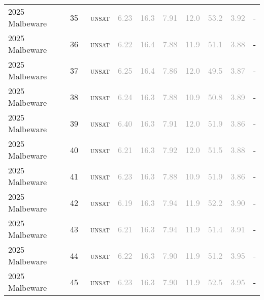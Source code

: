 \begin{center}
{\begin{longtable}{@{}llllllllll@{}}
2025 Malbeware & 35 & ~\textsc{unsat} & \textcolor{darkgray}{6.23} & \textcolor{darkgray}{16.3} & \textcolor{darkgray}{7.91} & \textcolor{darkgray}{12.0} & \textcolor{darkgray}{53.2} & \textcolor{darkgray}{3.92} & - \\
2025 Malbeware & 36 & ~\textsc{unsat} & \textcolor{darkgray}{6.22} & \textcolor{darkgray}{16.4} & \textcolor{darkgray}{7.88} & \textcolor{darkgray}{11.9} & \textcolor{darkgray}{51.1} & \textcolor{darkgray}{3.88} & - \\
2025 Malbeware & 37 & ~\textsc{unsat} & \textcolor{darkgray}{6.25} & \textcolor{darkgray}{16.4} & \textcolor{darkgray}{7.86} & \textcolor{darkgray}{12.0} & \textcolor{darkgray}{49.5} & \textcolor{darkgray}{3.87} & - \\
2025 Malbeware & 38 & ~\textsc{unsat} & \textcolor{darkgray}{6.24} & \textcolor{darkgray}{16.3} & \textcolor{darkgray}{7.88} & \textcolor{darkgray}{10.9} & \textcolor{darkgray}{50.8} & \textcolor{darkgray}{3.89} & - \\
2025 Malbeware & 39 & ~\textsc{unsat} & \textcolor{darkgray}{6.40} & \textcolor{darkgray}{16.3} & \textcolor{darkgray}{7.91} & \textcolor{darkgray}{12.0} & \textcolor{darkgray}{51.9} & \textcolor{darkgray}{3.86} & - \\
2025 Malbeware & 40 & ~\textsc{unsat} & \textcolor{darkgray}{6.21} & \textcolor{darkgray}{16.3} & \textcolor{darkgray}{7.92} & \textcolor{darkgray}{12.0} & \textcolor{darkgray}{51.5} & \textcolor{darkgray}{3.88} & - \\
2025 Malbeware & 41 & ~\textsc{unsat} & \textcolor{darkgray}{6.23} & \textcolor{darkgray}{16.3} & \textcolor{darkgray}{7.88} & \textcolor{darkgray}{10.9} & \textcolor{darkgray}{51.9} & \textcolor{darkgray}{3.86} & - \\
2025 Malbeware & 42 & ~\textsc{unsat} & \textcolor{darkgray}{6.19} & \textcolor{darkgray}{16.3} & \textcolor{darkgray}{7.94} & \textcolor{darkgray}{11.9} & \textcolor{darkgray}{52.2} & \textcolor{darkgray}{3.90} & - \\
2025 Malbeware & 43 & ~\textsc{unsat} & \textcolor{darkgray}{6.21} & \textcolor{darkgray}{16.3} & \textcolor{darkgray}{7.94} & \textcolor{darkgray}{11.9} & \textcolor{darkgray}{51.4} & \textcolor{darkgray}{3.91} & - \\
2025 Malbeware & 44 & ~\textsc{unsat} & \textcolor{darkgray}{6.22} & \textcolor{darkgray}{16.3} & \textcolor{darkgray}{7.90} & \textcolor{darkgray}{11.9} & \textcolor{darkgray}{51.2} & \textcolor{darkgray}{3.95} & - \\
2025 Malbeware & 45 & ~\textsc{unsat} & \textcolor{darkgray}{6.23} & \textcolor{darkgray}{16.3} & \textcolor{darkgray}{7.90} & \textcolor{darkgray}{11.9} & \textcolor{darkgray}{52.5} & \textcolor{darkgray}{3.95} & - \\

\end{longtable}}
\end{center}

